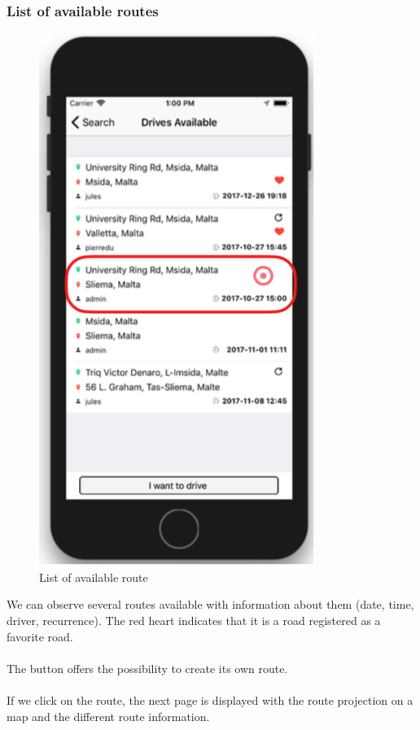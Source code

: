 \subsubsection{List of available routes}

\begin{figure}[h!]
\begin{center}
\includegraphics[scale = 0.3]{diagrams/ListAvailableRoutes.png} 
\end{center}
\caption{List of available route}
\end{figure}

We can observe several routes available with information about them (date, time, driver, recurrence). The red heart indicates that it is a road registered as a favorite road.
\\\\
The button offers the possibility to create its own route.
\\\\
If we click on the route, the next page is displayed with the route projection on a map and the different route information.
\\\\

